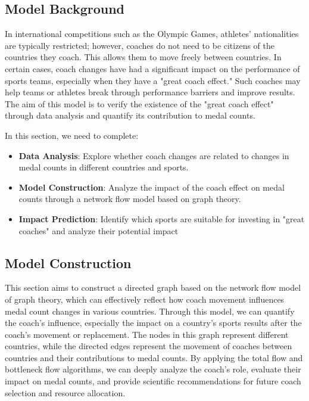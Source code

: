 \documentclass{mcmthesis}
\begin{document}
\subsection{Model Background}
In international competitions such as the Olympic Games, athletes' nationalities are typically restricted; however, coaches do not need to be citizens of the countries they coach. This allows them to move freely between countries. In certain cases, coach changes have had a significant impact on the performance of sports teams, especially when they have a "great coach effect." Such coaches may help teams or athletes break through performance barriers and improve results. The aim of this model is to verify the existence of the "great coach effect" through data analysis and quantify its contribution to medal counts.

In this section, we need to complete:
\begin{itemize}
    \item 	{\bf Data Analysis}: Explore whether coach changes are related to changes in medal counts in different countries and sports.
    \item	{\bf Model Construction}: Analyze the impact of the coach effect on medal counts through a network flow model based on graph theory.
    \item	{\bf Impact Prediction}: Identify which sports are suitable for investing in "great coaches" and analyze their potential impact
\end{itemize}

\subsection{Model Construction}
This section aims to construct a directed graph based on the network flow model of graph theory, which can effectively reflect how coach movement influences medal count changes in various countries. Through this model, we can quantify the coach’s influence, especially the impact on a country’s sports results after the coach's movement or replacement. The nodes in this graph represent different countries, while the directed edges represent the movement of coaches between countries and their contributions to medal counts. By applying the total flow and bottleneck flow algorithms, we can deeply analyze the coach's role, evaluate their impact on medal counts, and provide scientific recommendations for future coach selection and resource allocation.
\end{document}
